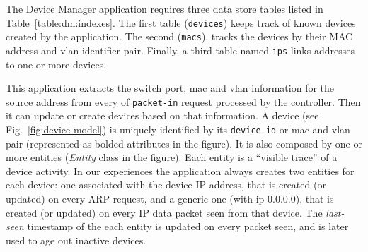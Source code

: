 The Device Manager application requires three data store tables listed in Table~\ref{table:dm:indexes}.
The first table (\texttt{devices}) keeps track of known devices created by the application.
The second (\texttt{macs}),  tracks the devices by their  MAC  address and \gls{vlan} identifier pair.
Finally, a third table named \texttt{ips} links   addresses to one or more devices.



\begin{figure}[ht]
\TopFloatBoxes
\begin{floatrow}

\end{floatrow}
\end{figure}

This application extracts  the switch port, \gls{mac} and \gls{vlan} information for the source address from every \gls{of} \texttt{packet-in} request processed by the controller. 
Then it can update or create devices based on that information. 
A device (see Fig.~\ref{fig:device-model}) is uniquely identified by its \texttt{device-id} or \gls{mac} and \gls{vlan} pair (represented as bolded attributes in the figure).
It is also composed by one or more entities (\emph{Entity} class in the figure). 
Each entity is a ``visible trace'' of a device activity. 
In our experiences the  application always creates two entities for each device: one associated with the device IP address, that is created (or updated) on every ARP request, and a generic one (with ip 0.0.0.0), that is created (or updated) on every IP data packet seen from that device. 
The \emph{last-seen} timestamp of the each entity is updated on every packet seen, and is later used to age out  inactive devices. 


